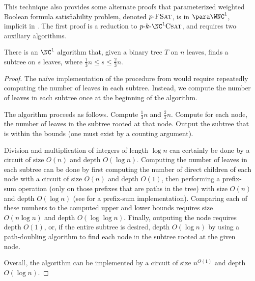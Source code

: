 
This technique also provides some alternate proofs that parameterized weighted Boolean formula satisfiability problem, denoted $p \textnormal{-} \textsc{FSat}$, is in $\para \WNC^1$, implicit in \autocite[Theorem~3.6]{est15}.
The first proof is a reduction to $p \dash k \dash \NC^1 \textsc{Csat}$, and requires two auxiliary algorithms.

\begin{lemma}
  There is an $\NC^1$ algorithm that, given a binary tree $T$ on $n$ leaves, finds a subtree on $s$ leaves, where $\frac{1}{3} n \leq s \leq \frac{2}{3} n$.
\end{lemma}
\begin{proof}
  The naïve implementation of the procedure from \autocite{lsh65} would require repeatedly computing the number of leaves in each subtree.
  Instead, we compute the number of leaves in each subtree once at the beginning of the algorithm.

  The algorithm proceeds as follows.
  Compute $\frac{1}{3} n$ and $\frac{2}{3} n$.
  Compute for each node, the number of leaves in the subtree rooted at that node.
  Output the subtree that is within the bounds (one must exist by a counting argument).

  Division and multiplication of integers of length $\log n$ can certainly be done by a circuit of size $O(n)$ and depth $O(\log n)$.
  Computing the number of leaves in each subtree can be done by first computing the number of direct children of each node with a circuit of size $O(n)$ and depth $O(1)$, then performing a prefix-sum operation (only on those prefixes that are paths in the tree) with size $O(n)$ and depth $O(\log n)$ (see \autocite[Theorem~2.6.1]{savage98} for a prefix-sum implementation).
  Comparing each of these numbers to the computed upper and lower bounds requires size $O(n \log n)$ and depth $O(\log \log n)$.
  Finally, outputing the node requires depth $O(1)$, or, if the entire subtree is desired, depth $O(\log n)$ by using a path-doubling algorithm to find each node in the subtree rooted at the given node.

  Overall, the algorithm can be implemented by a circuit of size $n^{O(1)}$ and depth $O(\log n)$.
\end{proof}

